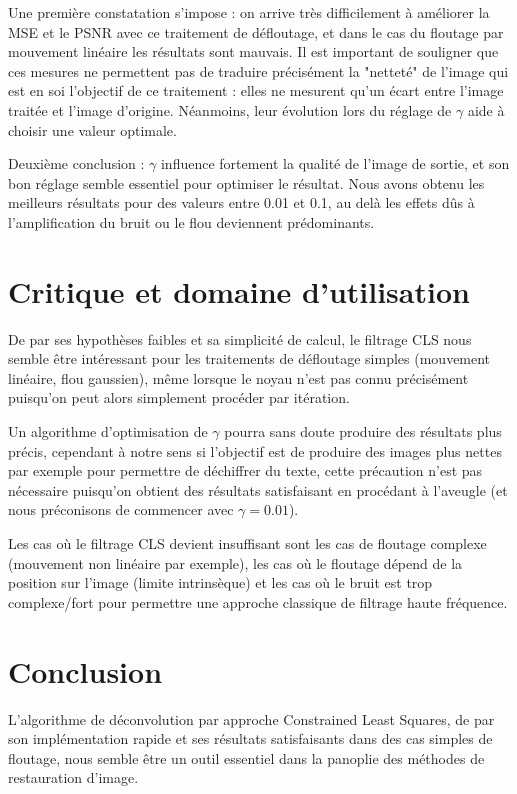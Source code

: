 \documentclass{article}
\begin{document}
	Une première constatation s'impose : on arrive très difficilement à améliorer la MSE et le PSNR avec ce traitement de défloutage, et dans le cas du floutage par mouvement linéaire les résultats sont mauvais. Il est important de souligner que ces mesures ne permettent pas de traduire précisément la "netteté" de l'image qui est en soi l'objectif de ce traitement : elles ne mesurent qu'un écart entre l'image traitée et l'image d'origine. Néanmoins, leur évolution lors du réglage de $\gamma$ aide à choisir une valeur optimale.
	
	Deuxième conclusion : $\gamma$ influence fortement la qualité de l'image de sortie, et son bon réglage semble essentiel pour optimiser le résultat. Nous avons obtenu les meilleurs résultats pour des valeurs entre 0.01 et 0.1, au delà les effets dûs à l'amplification du bruit ou le flou deviennent prédominants.
	
	
\section{Critique et domaine d'utilisation}

	De par ses hypothèses faibles et sa simplicité de calcul, le filtrage CLS nous semble être intéressant pour les traitements de défloutage simples (mouvement linéaire, flou gaussien), même lorsque le noyau n'est pas connu précisément puisqu'on peut alors simplement procéder par itération. 
	
	Un algorithme d'optimisation de $\gamma$ pourra sans doute produire des résultats plus précis, cependant à notre sens si l'objectif est de produire des images plus nettes par exemple pour permettre de déchiffrer du texte, cette précaution n'est pas nécessaire puisqu'on obtient des résultats satisfaisant en procédant à l'aveugle (et nous préconisons de commencer avec $\gamma = 0.01$).
	
	Les cas où le filtrage CLS devient insuffisant sont les cas de floutage complexe (mouvement non linéaire par exemple), les cas où le floutage dépend de la position sur l'image (limite intrinsèque) et les cas où le bruit est trop complexe/fort pour permettre une approche classique de filtrage haute fréquence.
	
	
\section{Conclusion}

	L'algorithme de déconvolution par approche Constrained Least Squares, de par son implémentation rapide et ses résultats satisfaisants dans des cas simples de floutage, nous semble être un outil essentiel dans la panoplie des méthodes de restauration d'image.

\nocite{*} 


\end{document}
